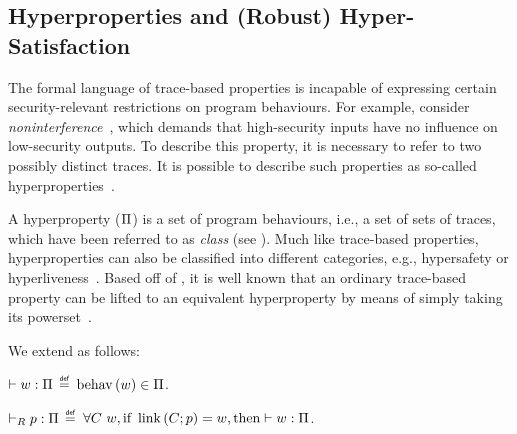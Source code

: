 \subsection{Hyperproperties and (Robust) Hyper-Satisfaction}\label{subsec:bg:hprop}

The formal language of trace-based properties is incapable of expressing certain security-relevant restrictions on program behaviours.
For example, consider {\em noninterference}~\cite{}, which demands that high-security inputs have no influence on low-security outputs.
To describe this property, it is necessary to refer to two possibly distinct traces.
It is possible to describe such properties as so-called hyperproperties~\cite{clarkson2008hyper}.

A hyperproperty ($\Pi$) is a set of program behaviours, i.e., a set of sets of traces, which have been referred to as {\em class} (see ).
Much like trace-based properties, hyperproperties can also be classified into different categories, e.g., hypersafety or hyperliveness~\cite{clarkson2008hyper}.
Based off of , it is well known that an ordinary trace-based property can be lifted to an equivalent hyperproperty by means of simply taking its powerset~\cite{clarkson2008hyper}.

We extend  as follows:

\begin{definition}\label{def:prophsat}
  $\vdash{w}:{\Pi}$
  $\isdef$
  $\operatorname{behav}\left({w}\right)\in\Pi$.
\end{definition}
\begin{definition}\label{def:proprhsat}
  $\vdash_R{p}:{\Pi}$
  $\isdef$ 
  $\forall\contextvar\ \wholeprogvar,\text{if}\ \link{\contextvar}{\progvar}=\wholeprogvar, \text{then}\sat{\wholeprogvar}{\varHProp}$.
\end{definition}

